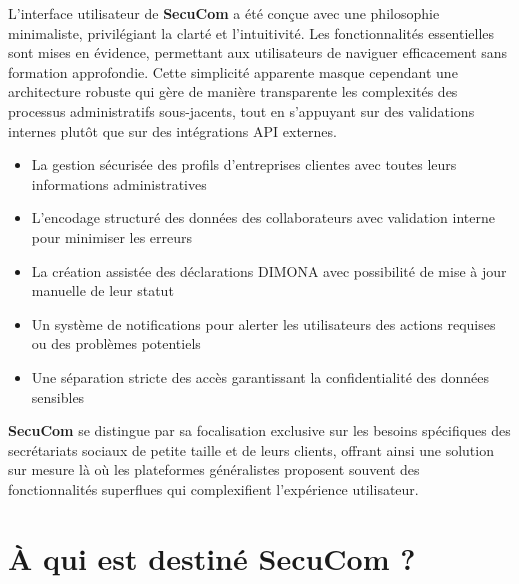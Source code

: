 \begin{note}
L'interface utilisateur de \textbf{SecuCom} a été conçue avec une philosophie minimaliste, privilégiant la clarté et l'intuitivité. Les fonctionnalités essentielles sont mises en évidence, permettant aux utilisateurs de naviguer efficacement sans formation approfondie. Cette simplicité apparente masque cependant une architecture robuste qui gère de manière transparente les complexités des processus administratifs sous-jacents, tout en s'appuyant sur des validations internes plutôt que sur des intégrations API externes.
\end{note}

\begin{tcolorbox}[
  title={\textbf{Fonctionnalités clés de SecuCom}},
  colback=blue!5!white,
  colframe=primarycolor,
  fonttitle=\bfseries,
  boxrule=0.5mm,
  arc=2mm,
  left=6mm,
  right=6mm,
  top=6mm,
  bottom=6mm
]
\begin{itemize}[leftmargin=*,label=\textcolor{darkgray}{$\bullet$},itemsep=0.3em]
  \item La gestion sécurisée des profils d'entreprises clientes avec toutes leurs informations administratives
  \item L'encodage structuré des données des collaborateurs avec validation interne pour minimiser les erreurs
  \item La création assistée des déclarations DIMONA avec possibilité de mise à jour manuelle de leur statut
  \item Un système de notifications pour alerter les utilisateurs des actions requises ou des problèmes potentiels
  \item Une séparation stricte des accès garantissant la confidentialité des données sensibles
\end{itemize}
\end{tcolorbox}

\vspace{0.5cm}

\noindent \textbf{SecuCom} se distingue par sa focalisation exclusive sur les besoins spécifiques des secrétariats sociaux de petite taille et de leurs clients, offrant ainsi une solution sur mesure là où les plateformes généralistes proposent souvent des fonctionnalités superflues qui complexifient l'expérience utilisateur.

\section{À qui est destiné SecuCom ?}

